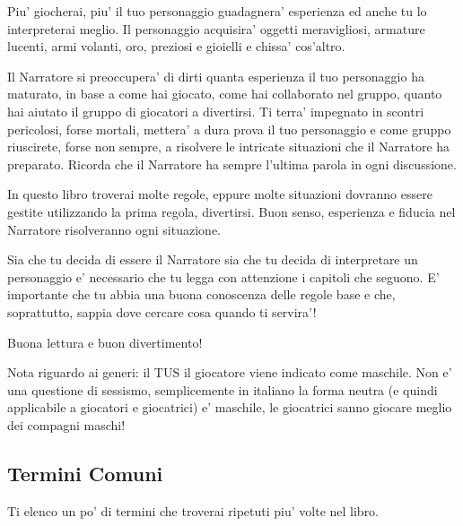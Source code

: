 \documentclass[a4paper,11pt,twoside,openany]{dndbook}
\begin{document}
Piu' giocherai, piu' il tuo personaggio guadagnera' esperienza ed anche tu lo interpreterai meglio. Il personaggio acquisira' oggetti meravigliosi, armature lucenti, armi volanti, oro, preziosi e gioielli e chissa' cos'altro.

Il Narratore si preoccupera' di dirti quanta esperienza il tuo personaggio ha maturato, in base a come hai giocato, come hai collaborato nel gruppo, quanto hai aiutato il gruppo di giocatori a divertirsi. Ti terra' impegnato in scontri pericolosi, forse mortali, mettera' a dura prova il tuo personaggio e come gruppo riuscirete, forse non sempre, a risolvere le intricate situazioni che il Narratore ha preparato. Ricorda che il Narratore ha sempre l'ultima parola in ogni discussione.

In questo libro troverai molte regole, eppure molte situazioni dovranno essere gestite utilizzando la prima regola, divertirsi. Buon senso, esperienza e fiducia nel Narratore risolveranno ogni situazione.

Sia che tu decida di essere il Narratore sia che tu decida di interpretare un personaggio e' necessario che tu legga con attenzione i capitoli che seguono.
E' importante che tu abbia una buona conoscenza delle regole base e che, soprattutto, sappia dove cercare cosa quando ti servira'!

Buona lettura e buon divertimento!

Nota riguardo ai generi: il TUS il giocatore viene indicato come maschile. Non e' una questione di sessismo, semplicemente in italiano la forma neutra (e quindi applicabile a giocatori e giocatrici) e' maschile, le giocatrici sanno giocare meglio dei compagni maschi!



\pagebreak{}

\subsection{Termini Comuni}

Ti elenco un po' di termini che troverai ripetuti piu' volte nel libro.
\end{document}
